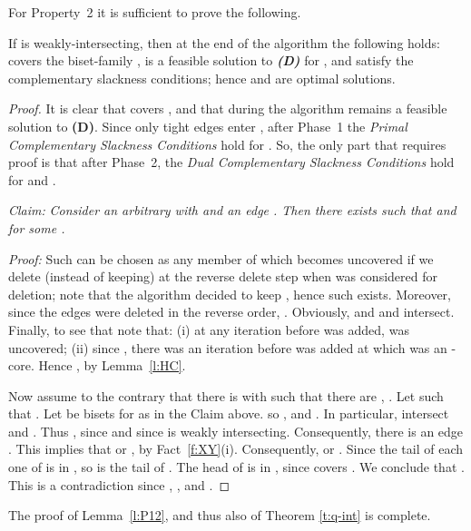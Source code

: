 For Property~2 it is sufficient to prove the following.

\begin{lemma} If  is weakly-intersecting, then at the end of the algorithm the following holds: 
 co\-vers the biset-family ,
 is a feasible solution to {\em \bf (D)} for , 
and  satisfy the complementary slackness conditions;
hence  and  are optimal solutions.
\end{lemma}
\begin{proof}
It is clear that  covers , 
and that during the algorithm  remains a feasible solution to {\bf (D)}.
Since only tight edges enter , after Phase~1 the {\em Primal Complementary Slackness Conditions} hold for .
So, the only part that requires proof is that after Phase~2, the 
{\em Dual Complementary Slackness Conditions} hold for  and .

\vspace{0.1cm}

\noindent
{\em  Claim:}
{\em Consider an arbitrary  with  and an edge .
Then there exists  such that  and 
 for some .}

\vspace{0.1cm}

\noindent
{\em Proof:}
Such  can be chosen as any member of 
which becomes uncovered if we delete (instead of keeping)
 at the reverse delete step when  was considered for deletion;
note that the algorithm decided to keep , hence such  exists.
Moreover, since the edges were deleted in the reverse order,
. 
Obviously,  and  and  intersect.
Finally, to see that  note that: 
(i) at any iteration before  was added,  was uncovered;
(ii) since , there was an iteration before  was added 
at which  was an -core. Hence , by Lemma~\ref{l:HC}. 
\hfill 

Now assume to the contrary that there is  with  
such that there are , .
Let  such that .
Let  be bisets for  as in the Claim above. 
so ,  and 
.
In particular,  intersect and .
Thus , since  
and since  is weakly intersecting.
Consequently, there is an edge . 
This implies that  or , by Fact~\ref{f:XY}(i).
Consequently,  or .
Since the tail of each one of  is in , so is the tail of .
The head of  is in , since  covers .
We conclude that . This is a contradiction since 
, , and . 
\end{proof}

The proof of Lemma~\ref{l:P12}, and thus also of Theorem \ref{t:q-int} is complete.

